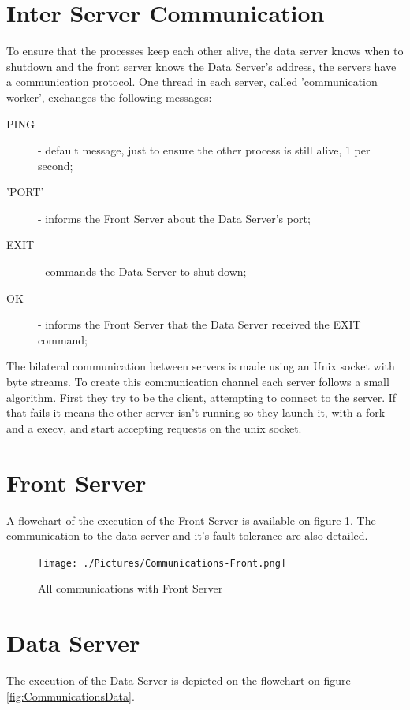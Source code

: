 \documentclass[12pt]{article} %
\begin{document}
\section{Inter Server Communication}
\label{sec:CommunicationProtocol}
To ensure that the processes keep each other alive, the data server knows when to shutdown and the front server knows the Data Server's address, the servers have a communication protocol.
One thread in each server, called 'communication worker', exchanges the following messages:
  \begin{description}
    \item[PING] - default message, just to ensure the other process is still alive, 1 per second;
    \item['PORT'] - informs the Front Server about the Data Server's port;
    \item[EXIT] - commands the Data Server to shut down;
    \item[OK] - informs the Front Server that the Data Server received the EXIT command;
  \end{description}

The bilateral communication between servers is made using an Unix socket with byte streams. To create this communication channel each server follows a small algorithm. First they try to be the client, attempting to connect to the server. If that fails it means the other server isn't running so they launch it, with a fork and a execv, and start accepting requests on the unix socket.

\section{Front Server}
\label{sec:FrontServer}

A flowchart of the execution of the Front Server is available on figure \ref{fig:CommunicationsFront}. The communication to the data server and it's fault tolerance are also detailed.

\begin{figure}[H]
\centering
\texttt{[image: ./Pictures/Communications-Front.png]}
\caption{All communications with Front Server}\label{fig:CommunicationsFront}
\end{figure}

\section{Data Server}
\label{sec:DataServer}

The execution of the Data Server is depicted on the flowchart on figure \ref{fig:CommunicationsData}.
\end{document}

